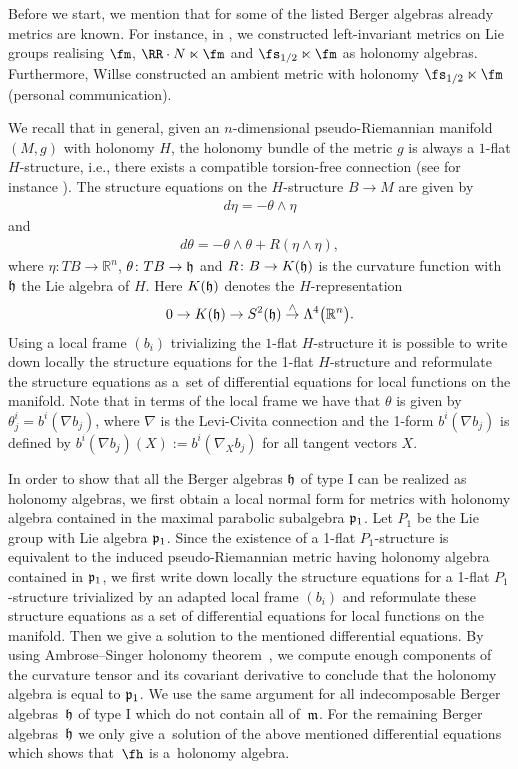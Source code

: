 Before we start, we mention that for some of the listed Berger algebras already metrics are known. For instance, in \cite{FK}, we constructed left-invariant metrics on Lie groups realising $\fm$, $\RR\cdot N\ltimes \fm$ and $\fs_{1/2}\ltimes \fm$ as holonomy algebras. Furthermore, Willse constructed an ambient metric with holonomy $\fs_{1/2}\ltimes \fm$ (personal communication).

We recall that in general, given an $n$-dimensional pseudo-Riemannian manifold $(M, g)$ with holonomy $H$, the holonomy bundle of the metric $g$ is always a $1$-flat $H$-structure, i.e., there exists a compatible torsion-free connection (see for instance \cite{Bryant}). The structure equations on the $H$-structure $B \rightarrow M$ are given by
\begin{gather*}
d \eta = - \theta \wedge \eta
\end{gather*}
and
\begin{gather*}
d \theta = - \theta \wedge \theta +R (\eta \wedge \eta),
\end{gather*}
where $\eta\colon TB \rightarrow {\mathbb R}^n$, $\theta\colon TB \rightarrow \frak h$ and $R\colon B \rightarrow K (\frak h)$ is the curvature function with $\frak h$ the Lie algebra of $H$. Here $K (\frak h)$ denotes the $H$-representation
\begin{gather*}
0 \rightarrow K (\frak h) \rightarrow S^2 (\frak h) \overset{\wedge}{\rightarrow} \Lambda^4 \big(\mathbb R^n\big).
\end{gather*}
Using a local frame $(b_i)$ trivializing the $1$-flat $H$-structure it is possible to write down locally the structure equations for the 1-flat $H$-structure and reformulate the structure equations as a~set of differential equations for local functions on the manifold. Note that in terms of the local frame we have that $\theta$ is given by $\theta^i_j=b^i(\nabla{b_j})$, where $\nabla$ is the Levi-Civita connection and the 1-form $b^i(\nabla{b_j})$ is defined by $b^i(\nabla{b_j})(X):=b^i(\nabla_X{b_j})$ for all tangent vectors $X$.

In order to show that all the Berger algebras $\frak h$ of type I can be realized as holonomy algebras, we first obtain a local normal form for metrics with holonomy algebra contained in the maximal parabolic subalgebra $\frak p_1$. Let $P_1$ be the Lie group with Lie algebra $\frak p_1$. Since the existence of a 1-flat $P_1$-structure is equivalent to the induced pseudo-Riemannian metric having holonomy algebra contained in $\frak p_1$, we first write down locally the structure equations for a 1-flat $P_1$-structure trivialized by an adapted local frame $(b_i)$ and reformulate these structure equations as a set of differential equations for local functions on the manifold. Then we give a solution to the mentioned differential equations. By using Ambrose--Singer holonomy theorem~\cite{AS}, we compute enough components of the curvature tensor and its covariant derivative to conclude that the holonomy algebra is equal to $\frak p_1$. We use the same argument for all indecomposable Berger algebras~$\frak h$ of type I which do not contain all of~$\frak m$. For the remaining Berger algebras~$\frak h$ we only give a~solution of the above mentioned differential equations which shows that~$\fh$ is a~holonomy algebra.

